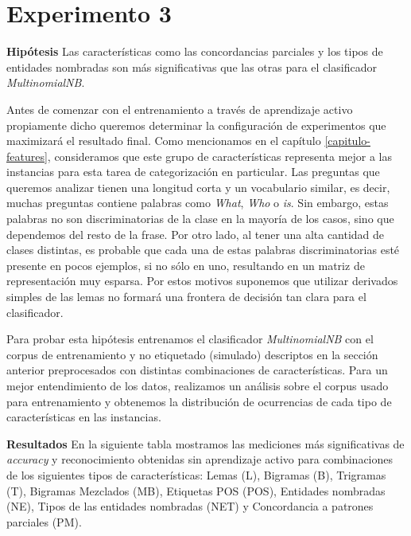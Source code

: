 \section{Experimento 3}
\vspace{3 mm}
\textbf{Hipótesis} Las características como las concordancias parciales y los tipos de entidades nombradas son más significativas que las otras para el clasificador \textit{MultinomialNB}.
\vspace{3 mm}

Antes de comenzar con el entrenamiento a través de aprendizaje activo propiamente dicho queremos determinar la configuración de experimentos que maximizará el resultado final. Como mencionamos en el capítulo \ref{capitulo-features}, consideramos que este grupo de características representa mejor a las instancias para esta tarea de categorización en particular. Las preguntas que queremos analizar tienen una longitud corta y un vocabulario similar, es decir, muchas preguntas contiene palabras como \textit{What}, \textit{Who} o \textit{is}. Sin embargo, estas palabras no son discriminatorias de la clase en la mayoría de los casos, sino que dependemos del resto de la frase. Por otro lado, al tener una alta cantidad de clases distintas, es probable que cada una de estas palabras discriminatorias esté presente en pocos ejemplos, si no sólo en uno, resultando en un matriz de representación muy esparsa. Por estos motivos suponemos que utilizar derivados simples de las lemas no formará una frontera de decisión tan clara para el clasificador.

Para probar esta hipótesis entrenamos el clasificador \textit{MultinomialNB} con el corpus de entrenamiento y no etiquetado (simulado) descriptos en la sección anterior preprocesados con distintas combinaciones de características. Para un mejor entendimiento de los datos, realizamos un análisis sobre el corpus usado para entrenamiento y obtenemos la distribución de ocurrencias de cada tipo de características en las instancias.

\vspace{3 mm}

\textbf{Resultados} En la siguiente tabla mostramos las mediciones más significativas de \textit{accuracy} y reconocimiento obtenidas sin aprendizaje activo para combinaciones de los siguientes tipos de características: Lemas (L), Bigramas (B), Trigramas (T), Bigramas Mezclados (MB), Etiquetas POS (POS), Entidades nombradas (NE), Tipos de las entidades nombradas (NET) y Concordancia a patrones parciales (PM).


